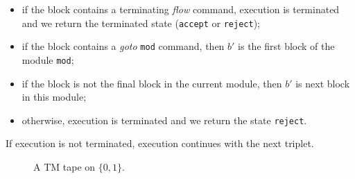 \documentclass{article}
\theoremstyle{definition}
\begin{document}
\begin{itemize}
\begin{itemize}
\begin{itemize}
                \item if the block contains a terminating \textit{flow} command, execution is terminated and we return the terminated state (\texttt{accept} or \texttt{reject});
                \item if the block contains a \textit{goto} \texttt{mod} command, then $b'$ is the first block of the module \texttt{mod};
                \item if the block is not the final block in the current module, then $b'$ is next block in this module;
                \item otherwise, execution is terminated and we return the state \texttt{reject}.
            \end{itemize}
        \end{itemize}
        If execution is not terminated, execution continues with the next triplet.
    \end{itemize}
    
    \begin{figure}[htb]
        \centering
        \caption{A TM tape on $\{0, 1\}$.}
        \label{fig:tml_tape_example}
    \end{figure}
     
\end{document}

